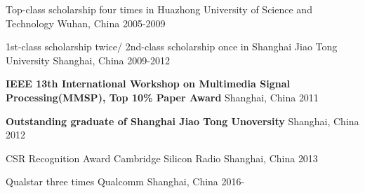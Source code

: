 



\begin{cvhonors}

  \cvhonor
    {} %
    {Top-class scholarship four times in Huazhong University of Science and Technology} %
    {Wuhan, China} %
    {2005-2009} %

  \cvhonor
    {} %
    {1st-class scholarship twice/ 2nd-class scholarship once in Shanghai Jiao Tong University} %
    {Shanghai, China} %
    {2009-2012} %

  \cvhonor
    {} %
    {\textbf{IEEE 13th International Workshop on Multimedia Signal Processing(MMSP), Top 10\% Paper Award}} %
    {Shanghai, China} %
    {2011} %

  \cvhonor
    {} %
    {\textbf{Outstanding graduate of Shanghai Jiao Tong Unoversity}} %
    {Shanghai, China} %
    {2012} %

\end{cvhonors}




\begin{cvhonors}

  \cvhonor
    {CSR Recognition Award} %
    {Cambridge Silicon Radio} %
    {Shanghai, China} %
    {2013} %

  \cvhonor
    {Qualstar three times} %
    {Qualcomm} %
    {Shanghai, China} %
    {2016-} %

\end{cvhonors}
